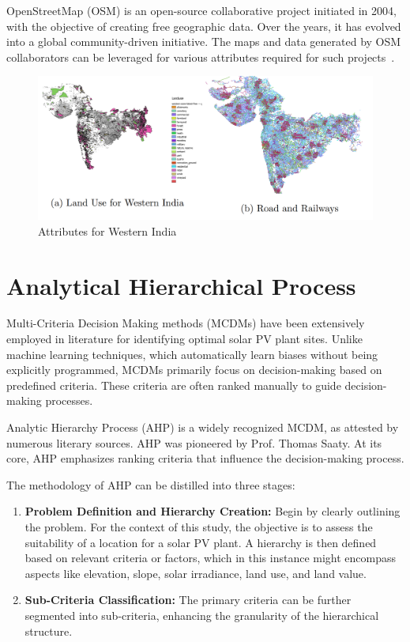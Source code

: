 \documentclass[a4paper,12pt]{Classes/RoboticsLaTeX}
\begin{document}
	OpenStreetMap (OSM) is an open-source collaborative project initiated in 2004, with the objective of creating free geographic data. Over the years, 
	it has evolved into a global community-driven initiative. The maps and data generated by OSM collaborators can be leveraged for various attributes required 
	for such projects~\cite{openstreetmap2017}.
	\begin{figure}[H]
		\centering
		\includegraphics[width=1\textwidth]{Figures/Other attributes.png} %
		\caption{Attributes for Western India}
		\label{fig:my_label5} %
	\end{figure}

	\section{Analytical Hierarchical Process}

	Multi-Criteria Decision Making methods (MCDMs) have been extensively employed in literature for identifying optimal solar PV plant sites. 
	Unlike machine learning techniques, which automatically learn biases without being explicitly programmed, MCDMs primarily focus on decision-making based on predefined criteria. 
	These criteria are often ranked manually to guide decision-making processes.

	Analytic Hierarchy Process (AHP) is a widely recognized MCDM, as attested by numerous literary sources\cite{colak2020,saraswat2021,garni2017,zoghi2017}. 
	AHP was pioneered by Prof. Thomas Saaty\cite{saaty1988}. At its core, AHP emphasizes ranking criteria that influence the decision-making process. 

	The methodology of AHP can be distilled into three stages:

	\begin{enumerate}
		\item \textbf{Problem Definition and Hierarchy Creation:} Begin by clearly outlining the problem. For the context of this study, the objective is to assess the suitability of a location for a solar PV plant. A hierarchy is then defined based on relevant criteria or factors, which in this instance might encompass aspects like elevation, slope, solar irradiance, land use, and land value.
		
		\item \textbf{Sub-Criteria Classification:} The primary criteria can be further segmented into sub-criteria, enhancing the granularity of the hierarchical structure.
		
	\end{enumerate}
\end{document}
